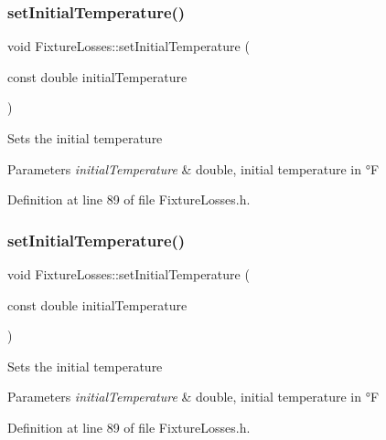\subsubsection{\texorpdfstring{set\+Initial\+Temperature()}{setInitialTemperature()}\hspace{0.1cm}{\footnotesize\ttfamily [1/3]}}
{\footnotesize\ttfamily void Fixture\+Losses\+::set\+Initial\+Temperature (\begin{DoxyParamCaption}\item[{const double}]{initial\+Temperature }\end{DoxyParamCaption})\hspace{0.3cm}{\ttfamily [inline]}}

Sets the initial temperature 
\begin{DoxyParams}{Parameters}
{\em initial\+Temperature} & double, initial temperature in °F \\
\hline
\end{DoxyParams}


Definition at line 89 of file Fixture\+Losses.\+h.

\mbox{\label{class_fixture_losses_ad3f2a1013dc5da103f2bcfc1357a449b}} 
\subsubsection{\texorpdfstring{set\+Initial\+Temperature()}{setInitialTemperature()}\hspace{0.1cm}{\footnotesize\ttfamily [2/3]}}
{\footnotesize\ttfamily void Fixture\+Losses\+::set\+Initial\+Temperature (\begin{DoxyParamCaption}\item[{const double}]{initial\+Temperature }\end{DoxyParamCaption})\hspace{0.3cm}{\ttfamily [inline]}}

Sets the initial temperature 
\begin{DoxyParams}{Parameters}
{\em initial\+Temperature} & double, initial temperature in °F \\
\hline
\end{DoxyParams}


Definition at line 89 of file Fixture\+Losses.\+h.

